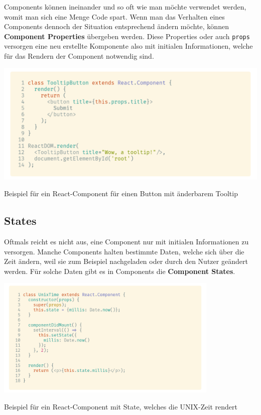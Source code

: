 Components können ineinander und so oft wie man möchte verwendet werden, womit man sich eine Menge Code spart. Wenn man das Verhalten eines Components dennoch der Situation entsprechend ändern möchte, können \textbf{Component Properties} übergeben werden. Diese Properties oder auch \lstinline{props} versorgen eine neu erstellte Komponente also mit initialen Informationen, welche für das Rendern der Component notwendig sind.

\begin{code}[h]
    \centering
    \includegraphics[width=1\textwidth]{images/React/button.png}
    \caption{Beispiel für ein React-Component für einen Button mit änderbarem Tooltip}
\end{code}

\subsection{States}

Oftmals reicht es nicht aus, eine Component nur mit initialen Informationen zu versorgen. Manche Components halten bestimmte Daten, welche sich über die Zeit ändern, weil sie zum Beispiel nachgeladen oder durch den Nutzer geändert werden. Für solche Daten gibt es in Components die \textbf{Component States}.

\begin{code}[h]
    \centering
    \includegraphics[width=0.8\textwidth]{images/React/unixtime.png}
    \caption{Beispiel für ein React-Component mit State, welches die UNIX-Zeit rendert}
\end{code}